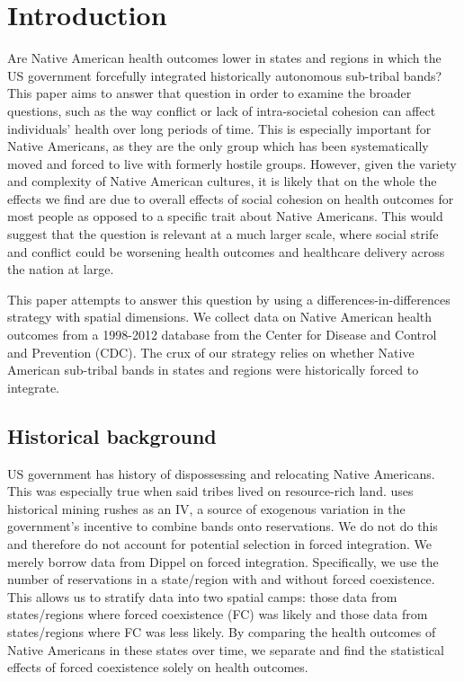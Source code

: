 \documentclass[12pt]{article}
\begin{document}
\doublespacing

\section{Introduction}
Are Native American health outcomes lower in states and regions in which the US government forcefully integrated historically autonomous sub-tribal bands? 
This paper aims to answer that question in order to examine the broader questions, such as the way conflict or lack of intra-societal cohesion can affect individuals’ health over long periods of time.
This is especially important for Native Americans, as they are the only group which has been systematically moved and forced to live with formerly hostile groups.
However, given the variety and complexity of Native American cultures, it is likely that on the whole the effects we find are due to overall effects of social cohesion on health outcomes for most people as opposed to a specific trait about Native Americans.
This would suggest that the question is relevant at a much larger scale, where social strife and conflict could be worsening health outcomes and healthcare delivery across the nation at large.

This paper attempts to answer this question by using a differences-in-differences strategy with spatial dimensions. 
We collect data on Native American health outcomes from a 1998-2012 database from the Center for Disease and Control and Prevention (CDC).
The crux of our strategy relies on whether Native American sub-tribal bands in states and regions were historically forced to integrate.

\subsection{Historical background}
US government has history of dispossessing and relocating Native Americans.
This was especially true when said tribes lived on resource-rich land. 
\cite{dippel2010forced} uses historical mining rushes as an IV, a source of exogenous variation in the government's incentive to combine bands onto reservations.
We do not do this and therefore do not account for potential selection in forced integration. 
We merely borrow data from Dippel on forced integration.
Specifically, we use the number of reservations in a state/region with and without forced coexistence.
This allows us to stratify data into two spatial camps: those data from states/regions where forced coexistence (FC) was likely and those data from states/regions where FC was less likely.
By comparing the health outcomes of Native Americans in these states over time, we separate and find the statistical effects of forced coexistence solely on health outcomes.
    
\end{document}
